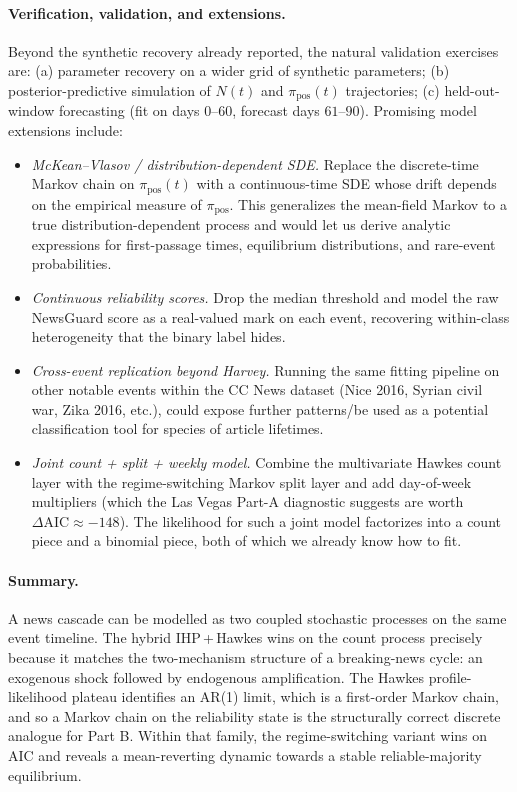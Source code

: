 \documentclass[11pt]{article}
\newcommand{\pipos}{\pi_{\mathrm{pos}}}
\begin{document}
\paragraph{Verification, validation, and extensions.}
Beyond the synthetic recovery already reported, the natural validation
exercises are: (a) parameter recovery on a wider grid of synthetic
parameters; (b) posterior-predictive simulation of $N(t)$ and $\pipos(t)$
trajectories; (c) held-out-window forecasting (fit on days $0$--$60$,
forecast days $61$--$90$). Promising model extensions include:

\begin{itemize}
  \item \emph{McKean--Vlasov / distribution-dependent SDE.} Replace the
        discrete-time Markov chain on $\pipos(t)$ with a continuous-time SDE
        whose drift depends on the empirical measure of $\pipos$. This
        generalizes the mean-field Markov to a true distribution-dependent
        process and would let us derive analytic expressions for first-passage
        times, equilibrium distributions, and rare-event probabilities.
  \item \emph{Continuous reliability scores.} Drop the median threshold and
        model the raw NewsGuard score as a real-valued mark on each event,
        recovering within-class heterogeneity that the binary label hides.
  \item \emph{Cross-event replication beyond Harvey.} Running the same fitting
        pipeline on other notable events within the CC News dataset 
        (Nice 2016, Syrian civil war, Zika 2016, etc.), could expose further patterns/be used
        as a potential classification tool for species of article lifetimes.
  \item \emph{Joint count + split + weekly model.} Combine the multivariate
        Hawkes count layer with the regime-switching Markov split layer and
        add day-of-week multipliers (which the Las Vegas Part-A diagnostic
        suggests are worth $\Delta\mathrm{AIC}\approx -148$). The likelihood
        for such a joint model factorizes into a count piece and a binomial
        piece, both of which we already know how to fit.
\end{itemize}

\paragraph{Summary.}
A news cascade can be modelled as two coupled stochastic
processes on the same event timeline. The hybrid IHP\,+\,Hawkes wins on the
count process precisely because it matches the two-mechanism structure of a
breaking-news cycle: an exogenous shock followed by endogenous amplification.
The Hawkes profile-likelihood plateau identifies an AR(1) limit, which is a
first-order Markov chain, and so a Markov chain on the reliability state is
the structurally correct discrete analogue for Part B. Within that family,
the regime-switching variant wins on AIC and reveals a mean-reverting dynamic
towards a stable reliable-majority equilibrium.
\end{document}
